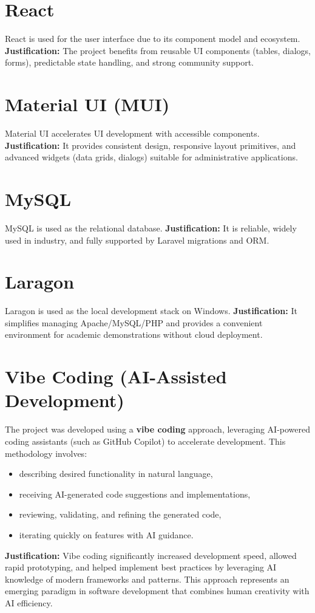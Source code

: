 \documentclass[12pt,a4paper]{report}
\begin{document}
\section{React}
React is used for the user interface due to its component model and ecosystem.
\textbf{Justification:} The project benefits from reusable UI components (tables, dialogs, forms), predictable state handling, and strong community support.

\section{Material UI (MUI)}
Material UI accelerates UI development with accessible components.
\textbf{Justification:} It provides consistent design, responsive layout primitives, and advanced widgets (data grids, dialogs) suitable for administrative applications.

\section{MySQL}
MySQL is used as the relational database.
\textbf{Justification:} It is reliable, widely used in industry, and fully supported by Laravel migrations and ORM.

\section{Laragon}
Laragon is used as the local development stack on Windows.
\textbf{Justification:} It simplifies managing Apache/MySQL/PHP and provides a convenient environment for academic demonstrations without cloud deployment.

\section{Vibe Coding (AI-Assisted Development)}
The project was developed using a \textbf{vibe coding} approach, leveraging AI-powered coding assistants (such as GitHub Copilot) to accelerate development. This methodology involves:
\begin{itemize}
  \item describing desired functionality in natural language,
  \item receiving AI-generated code suggestions and implementations,
  \item reviewing, validating, and refining the generated code,
  \item iterating quickly on features with AI guidance.
\end{itemize}
\textbf{Justification:} Vibe coding significantly increased development speed, allowed rapid prototyping, and helped implement best practices by leveraging AI knowledge of modern frameworks and patterns. This approach represents an emerging paradigm in software development that combines human creativity with AI efficiency.
\end{document}
